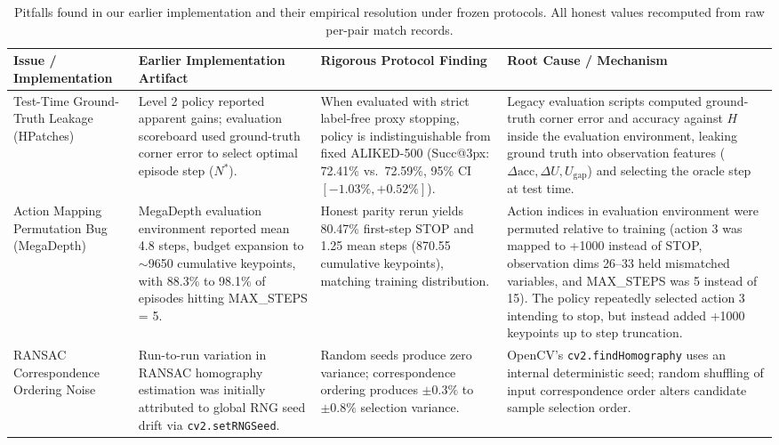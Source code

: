 \documentclass[conference]{IEEEtran}
\begin{document}
\begin{table}[t]
\centering
\caption{Pitfalls found in our earlier implementation and their empirical resolution under frozen protocols. All honest values recomputed from raw per-pair match records.}
\label{tab:audit_table}
\small
\begin{tabular}{p{3.2cm}p{3.8cm}p{3.8cm}p{5.2cm}}
\hline
\textbf{Issue / Implementation} & \textbf{Earlier Implementation Artifact} & \textbf{Rigorous Protocol Finding} & \textbf{Root Cause / Mechanism} \\
\hline
Test-Time Ground-Truth Leakage (HPatches) & Level 2 policy reported apparent gains; evaluation scoreboard used ground-truth corner error to select optimal episode step ($N^*$). & When evaluated with strict label-free proxy stopping, policy is indistinguishable from fixed ALIKED-500 (Succ@3px: 72.41\% vs.\ 72.59\%, 95\% CI $[-1.03\%, +0.52\%]$). & Legacy evaluation scripts computed ground-truth corner error and accuracy against $H$ inside the evaluation environment, leaking ground truth into observation features ($\Delta\text{acc}, \Delta U, U_{\text{gap}}$) and selecting the oracle step at test time. \\
\hline
Action Mapping Permutation Bug (MegaDepth) & MegaDepth evaluation environment reported mean 4.8 steps, budget expansion to $\sim$9650 cumulative keypoints, with 88.3\% to 98.1\% of episodes hitting MAX\_STEPS = 5. & Honest parity rerun yields 80.47\% first-step STOP and 1.25 mean steps (870.55 cumulative keypoints), matching training distribution. & Action indices in evaluation environment were permuted relative to training (action 3 was mapped to +1000 instead of STOP, observation dims 26--33 held mismatched variables, and MAX\_STEPS was 5 instead of 15). The policy repeatedly selected action 3 intending to stop, but instead added +1000 keypoints up to step truncation. \\
\hline
RANSAC Correspondence Ordering Noise & Run-to-run variation in RANSAC homography estimation was initially attributed to global RNG seed drift via \texttt{cv2.setRNGSeed}. & Random seeds produce zero variance; correspondence ordering produces $\pm 0.3\%$ to $\pm 0.8\%$ selection variance. & OpenCV's \texttt{cv2.findHomography} uses an internal deterministic seed; random shuffling of input correspondence order alters candidate sample selection order. \\
\hline
\end{tabular}
\end{table}
\end{document}
